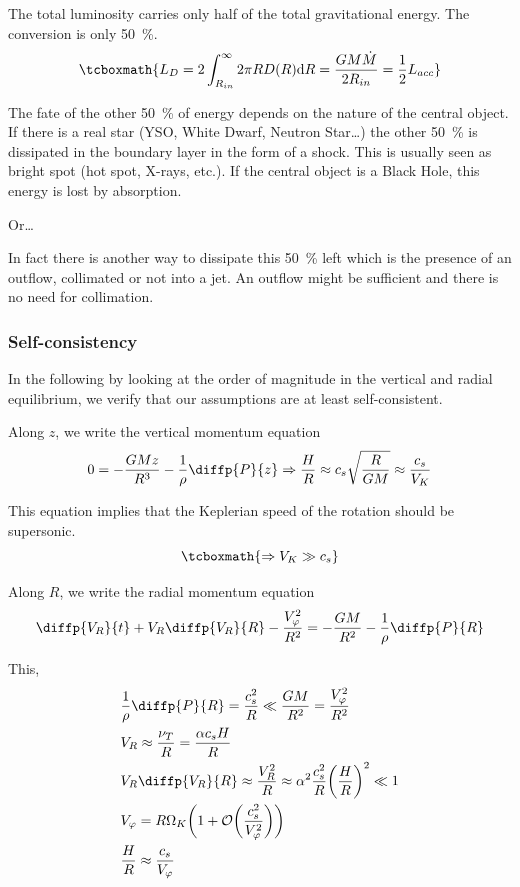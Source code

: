 \documentclass[10pt,a4paper,english]{article}
\let\originalleft\left
\let\originalright\right
\renewcommand{\left}{\mathopen{}\mathclose\bgroup\originalleft}
\renewcommand{\right}{\aftergroup\egroup\originalright}
\begin{document}
The total luminosity carries only half of the total gravitational energy. The
conversion is only \SI{50}{\percent}.
\begin{equation}
    \tcboxmath{
        L_D = 2 \int_{R_{in}}^{\infty} 2 \pi R D(R) \d{R} = \frac{G M \dot{M}}{2 R_{in}} = \frac{1}{2} L_{acc}
    }
\end{equation}

The fate of the other \SI{50}{\percent} of energy depends on the nature of the
central object. If there is a real star (YSO, White Dwarf, Neutron Star…) the
other \SI{50}{\percent} is dissipated in the boundary layer in the form of a
shock. This is usually seen as bright spot (hot spot, X-rays, etc.). If the
central object is a Black Hole, this energy is lost by absorption.

Or…

In fact there is another way to dissipate this \SI{50}{\percent} left which is
the presence of an outflow, collimated or not into a jet. An outflow might be
sufficient and there is no need for collimation.

\subsubsection{Self-consistency}

In the following by looking at the order of magnitude in the vertical and
radial equilibrium, we verify that our assumptions are at least
self-consistent.

Along $z$, we write the vertical momentum equation
\begin{equation}
    0 = - \frac{G M z} {R^3} - \frac{1}{\rho} \diffp{P}{z} \Rightarrow \frac{H}{R} \approx c_s \sqrt{\frac{R}{G M}} \approx \frac{c_s}{V_K}
\end{equation}

This equation implies that the Keplerian speed of the rotation should be supersonic.
\begin{equation}
    \tcboxmath{
        \Rightarrow V_K \gg c_s
    }
\end{equation}

Along $R$, we write the radial momentum equation
\begin{equation}
    \diffp{V_R}{t} + V_R \diffp{V_R}{R} - \frac{V_\varphi^2}{R^2} = - \frac{G M}{R^2} - \frac{1}{\rho} \diffp{P}{R}
\end{equation}

This,
\begin{align*}
    & \frac{1}{\rho} \diffp{P}{R} = \frac{c_s^2}{R} \ll \frac{G M}{R^2} = \frac{V_\varphi^2}{R^2} \\
    & V_R \approx \frac{\nu_T}{R} = \frac{\alpha c_s H}{R} \\
    & V_R \diffp{V_R}{R} \approx \frac{V_R^2}{R} \approx \alpha^2 \frac{c_s^2}{R} \left(\frac{H}{R}\right)^2 \ll 1\\
    & V_\varphi = R \Omega_K \left(1 + \mathcal{O}\left(\frac{c_s^2}{V_\varphi^2}\right) \right) \\
    & \frac{H}{R} \approx \frac{c_s}{V_\varphi}
\end{align*}
\end{document}
